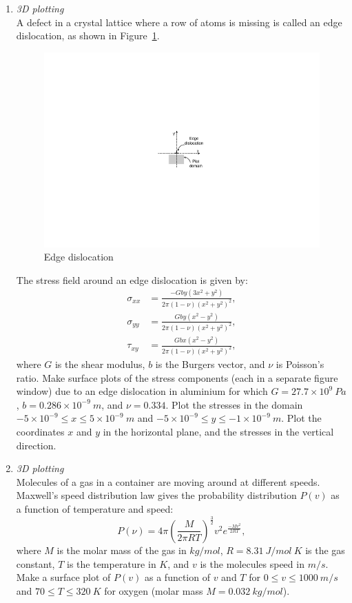 \begin{enumerate}
\item \textit{3D plotting}\\
A defect in a crystal lattice where a row of atoms is missing is called an edge dislocation, as shown in Figure~\ref{fig:edge-disloc}. 
\begin{figure}[h]
	\myfloatalign
	\includegraphics[width=0.4\linewidth]{Graphics/Additional-Ex/edge-disloc}
	\caption{Edge dislocation}
	\label{fig:edge-disloc}
\end{figure}
The stress field around an edge dislocation is given by:
\begin{align*}
\sigma_{xx} &= \frac{-Gby(3x^2+y^2)}{2\pi(1-\nu){(x^2+y^2)}^2}, \\
\sigma_{yy} &= \frac{Gby(x^2-y^2)}{2\pi(1-\nu){(x^2+y^2)}^2}, \\
\tau_{xy} &= \frac{Gbx(x^2-y^2)}{2\pi(1-\nu){(x^2+y^2)}^2},
\end{align*}
where $G$ is the shear modulus, $b$ is the Burgers vector, and $\nu$ is Poisson's ratio. Make \threed surface plots of the stress components (each in a separate figure window) due to an edge dislocation in aluminium for which $G=27.7\times 10^9~Pa$, $b=0.286\times 10^{-9}~m$, and $\nu = 0.334$. Plot the stresses in the domain $-5\times 10^{-9} \leq x \leq 5\times 10^{-9}~m$ and $-5\times 10^{-9} \leq y \leq -1\times 10^{-9}~m$. Plot the coordinates $x$ and $y$ in the horizontal plane, and the stresses in the vertical direction.

\item \textit{3D plotting}\\
Molecules of a gas in a container are moving around at different speeds. Maxwell's speed distribution law gives the probability distribution $P(v)$ as a function of temperature and speed:
\begin{equation*}
P(\nu) = 4\pi {\left( \frac{M}{2\pi RT} \right)}^{\frac{3}{2}} v^2 e^{\frac{-Mv^2}{2RT}},
\end{equation*}
where $M$ is the molar mass of the gas in $kg/mol$, $R=8.31~J/mol~K$ is the gas constant, $T$ is the temperature in $K$, and $v$ is the molecules speed in $m/s$. Make a \threed surface plot of $P(v)$ as a function of $v$ and $T$ for $0\leq v \leq 1000~m/s$ and $70\leq T \leq 320~K$ for oxygen (molar mass $M=0.032~kg/mol$).


\end{enumerate}
